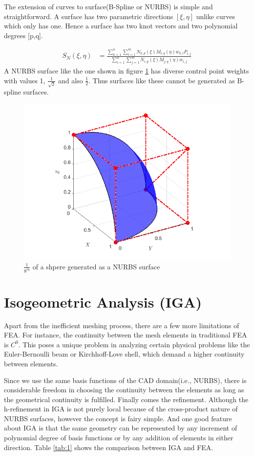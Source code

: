 \documentclass[12pt, a4paper]{report}
\begin{document}
The extension of curves to surface(B-Spline or NURBS) is simple and straightforward. A surface has two parametric directions $[\xi,\eta]$ unlike curves which only has one. Hence a surface has two knot vectors and two polynomial degrees [p,q].

\begin{align}
S_N(\xi, \eta) &=\frac{\sum_{k=1}^{n} \sum_{l=1}^{m} N_{k,p}(\xi)M_{l,q}(\eta)w_{k,l} P_{i,j}}{\sum_{i=1}^{n} \sum_{j=1}^{m} N_{i,p}(\xi)M_{j,q}(\eta)w_{i,j} } 
\end{align}
A NURBS surface like the one shown in figure \ref{fig:nurb_surf} has diverse control point weights with values 1, $\frac{1}{\sqrt{2}}$ and also $\frac{1}{2}$. Thus surfaces like these cannot be generated as B-spline surfaces. 
\begin{figure}[H]
\centering
\includegraphics[width=0.8\linewidth]{Images/nurbs_surf.png}
\caption{$\frac{1}{8^{th}}$ of a shpere generated as a NURBS surface}
\label{fig:nurb_surf}
\end{figure}



\section{Isogeometric Analysis (IGA)}
 Apart from the inefficient meshing process, there are a few more limitations of FEA. For instance, the continuity between the mesh elements in traditional FEA is $C^0$. This poses a unique problem in analyzing certain physical problems like the Euler-Bernoulli beam or Kirchhoff-Love shell, which demand a higher continuity between elements. 
 \par
 Since we use the same basis functions of the CAD domain(i.e., NURBS), there is considerable freedom in choosing the continuity between the elements as long as the geometrical continuity is fulfilled.
 Finally comes the refinement. Although the h-refinement in IGA is not purely local because of the cross-product nature of NURBS surfaces, however the concept is fairy simple. And one good feature about IGA is that the same geometry can be represented by any increment of polynomial degree of basis functions or by any addition of elements in either direction. Table \ref{tab:1} shows the comparison between IGA and FEA.
\end{document}
